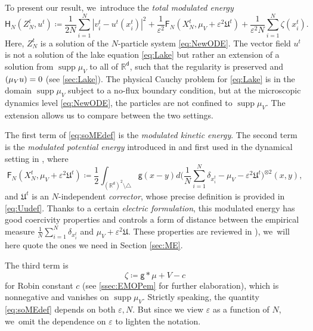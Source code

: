 \documentclass[JEP,XML,SOM,Unicode,published]{cedram}
\theoremstyle{plain}
\theoremstyle{definition}
\DeclareMathOperator{\supp}{supp}
\let\div\relax
\DeclareMathOperator{\div}{\mathrm{div}}
\newcommand{\R}{{\mathbb{R}}}
\let\vep\varepsilon
\let\ux X
\let\uz Z
\newcommand{\Uu}{\mathfrak{U}}
\newcommand{\Fr}{\mathsf{F}}
\newcommand{\Hr}{\mathsf{H}}
\renewcommand{\d}{\mathsf{d}}
\newcommand{\g}{{\mathsf{g}}}
\begin{document}
To present our result, we~introduce the \emph{total modulated energy}
\begin{equation}\label{eq:soMEdef}
\Hr_{N}(\uz_N^t, u^t) \coloneqq \frac{1}{2N}\sum_{i=1}^N |v_i^t-u^t(x_i^t)|^2 + \frac{1}{\vep^2}\Fr_N(\ux_N^t,\mu_V+\vep^2\Uu^t) + \frac{1}{\vep^2 N}\sum_{i=1}^N \zeta(x_i^t).
\end{equation}
Here, $\uz_N^t$ is a solution of the $N$-particle system \eqref{eq:NewODE}. The vector field $u^t$ is not a solution of the lake equation \eqref{eq:Lake} but rather an extension of a solution from $\supp \mu_V $ to all of $\R^\d$, such that the regularity is preserved and $\div(\mu_V u) = 0$ (see \cref{sec:Lake}). The physical Cauchy problem for \eqref{eq:Lake} is in the domain $\supp\mu_V$ subject to a no-flux boundary condition, but at the microscopic dynamics level \eqref{eq:NewODE}, the particles are not confined to $\supp\mu_V$. The extension allows us to compare between the two settings.

The first term of \eqref{eq:soMEdef} is the \emph{modulated kinetic energy}. The second term is the \emph{modulated potential energy} { introduced in \cite{SS2015,PS2017} and first used in the dynamical setting in \cite{Duerinckx2016, Serfaty2020},} where
\begin{equation}\label{eq:introMPEdef}
\Fr_N(X_N^t,\mu_V+\vep^2\Uu^t) \coloneqq \frac12\int_{(\R^\d)^2\setminus\triangle}\g(x-y)d\Big(\frac1N\sum_{i=1}^N\delta_{x_i^t} - \mu_V - \vep^2\Uu^t\Big)^{\otimes 2}(x,y),
\end{equation}
{and $\Uu^t$ is an $N$-independent \emph{corrector}, whose precise definition is provided in \eqref{eq:Uudef}.
Thanks to a certain {\it electric formulation}, this modulated energy has good coercivity properties and controls a form of distance between the empirical measure $\frac1N \sum_{i=1}^N \delta_{x_i^t} $ and $\mu_V+\vep^2 \Uu$. These properties are reviewed in \cite[Chap.\,4]{SerfatyLN}), we~will here quote the ones we need in Section \ref{sec:ME}.}

The third term is
\begin{equation}\label{eq:introzetadef}
\zeta\coloneqq \g\ast\mu + V - c
\end{equation}
for Robin constant $c$ (see \cref{ssec:EMOPem} for further elaboration), {which is nonnegative and vanishes on $\supp \mu_V$}. Strictly speaking, the quantity \eqref{eq:soMEdef} depends on both $\vep,N$. But since we view $\vep$ as a function of $N$, we~omit the dependence on $\vep$ to lighten the notation.
\end{document}
